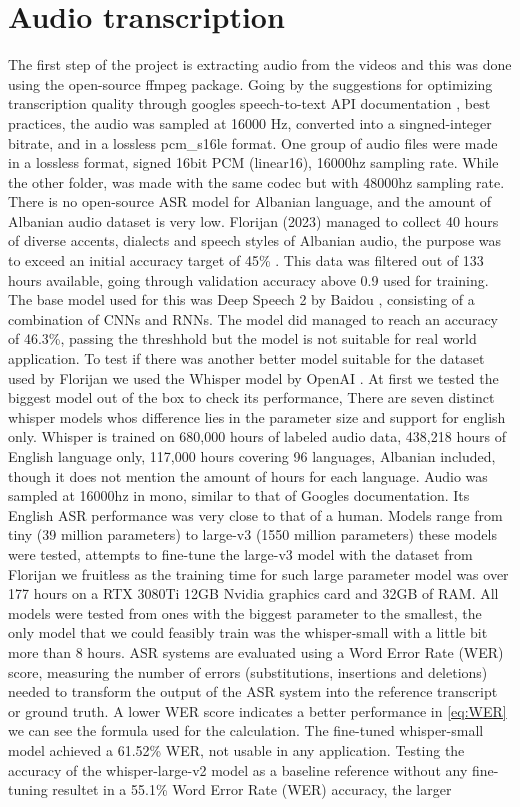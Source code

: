 \documentclass[12pt]{article}
\begin{document}
\section{Audio transcription}
The first step of the project is extracting audio from the videos and this was done using the open-source ffmpeg package. Going by the suggestions for optimizing transcription quality through googles speech-to-text API documentation \cite{google_api_docs}, best practices, the audio was sampled at 16000 Hz, converted into a singned-integer bitrate, and in a lossless pcm\_s16le format. One group of audio files were made in a lossless format, signed 16bit PCM (linear16), 16000hz sampling rate. While the other folder, was made with the same codec but with 48000hz sampling rate.\\There is no open-source ASR model for Albanian language, and the amount of Albanian audio dataset is very low. Florijan (2023) managed to collect 40 hours of diverse accents, dialects and speech styles of Albanian audio, the purpose was to exceed an initial accuracy target of 45\% \cite{florijan-qosja}. This data was filtered out of 133 hours available, going through validation accuracy above 0.9 used for training. The base model used for this was Deep Speech 2 by Baidou \cite{deep-speech}, consisting of a combination of CNNs and RNNs. The model did managed to reach an accuracy of 46.3\%, passing the threshhold but the model is not suitable for real world application. To test if there was another better model suitable for the dataset used by Florijan we used the Whisper model by OpenAI \cite{openai_whisper}. At first we tested the biggest model out of the box to check its performance, There are seven distinct whisper models whos difference lies in the parameter size and support for english only. Whisper is trained on 680,000 hours of labeled audio data, 438,218 hours of English language only, 117,000 hours covering 96 languages, Albanian included, though it does not mention the amount of hours for each language. Audio was sampled at 16000hz in mono, similar to that of Googles documentation. Its English ASR performance was very close to that of a human. Models range from tiny (39 million parameters) to large-v3 (1550 million parameters) these models were tested, attempts to fine-tune the large-v3 model with the dataset from Florijan we fruitless as the training time for such large parameter model was over 177 hours on a RTX 3080Ti 12GB Nvidia graphics card and 32GB of RAM. All models were tested from ones with the biggest parameter to the smallest, the only model that we could feasibly train was the whisper-small with a little bit more than 8 hours. ASR systems are evaluated using a Word Error Rate (WER) score, measuring the number of errors (substitutions, insertions and deletions) needed to transform the output of the ASR system into the reference transcript or ground truth. A lower WER score indicates a better performance in \ref{eq:WER} we can see the formula used for the calculation. The fine-tuned whisper-small model achieved a 61.52\% WER, not usable in any application. Testing the accuracy of the whisper-large-v2 model as a baseline reference without any fine-tuning resultet in a 55.1\% Word Error Rate (WER) accuracy, the larger 
\end{document}
